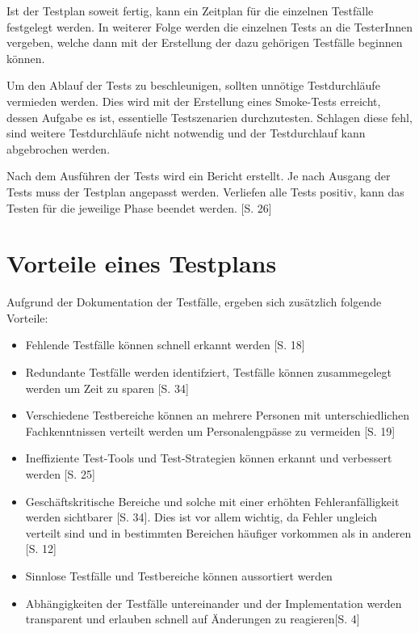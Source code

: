 \documentclass[a4paper,bibtotoc,oneside]{scrbook}
\begin{document}
Ist der Testplan soweit fertig, kann ein Zeitplan für die einzelnen Testfälle festgelegt werden. In weiterer Folge werden die einzelnen Tests an die TesterInnen vergeben, welche dann mit der Erstellung der dazu gehörigen Testfälle beginnen können.

Um den Ablauf der Tests zu beschleunigen, sollten unnötige Testdurchläufe vermieden werden. Dies wird mit der Erstellung eines Smoke-Tests erreicht, dessen Aufgabe es ist, essentielle Testszenarien durchzutesten. Schlagen diese fehl, sind weitere Testdurchläufe nicht notwendig und der Testdurchlauf kann abgebrochen werden. 

Nach dem Ausführen der Tests wird ein Bericht erstellt. Je nach Ausgang der Tests muss der Testplan angepasst werden. Verliefen alle Tests positiv, kann das Testen für die jeweilige Phase beendet werden. \cite{eval_regression}[S. 26]


\section{Vorteile eines Testplans}

Aufgrund der Dokumentation der Testfälle, ergeben sich zusätzlich folgende Vorteile:

\begin{itemize}
	\item Fehlende Testfälle können schnell erkannt werden \cite{test_large_systems}[S. 18]
	\item Redundante Testfälle werden identifziert, Testfälle können zusammegelegt werden um Zeit zu sparen \cite{testing_apps_on_web}[S. 34]
	\item Verschiedene Testbereiche können an mehrere Personen mit unterschiedlichen Fachkenntnissen verteilt werden um Personalengpässe zu vermeiden \cite{test_large_systems}[S. 19]
	\item Ineffiziente Test-Tools und Test-Strategien können erkannt und verbessert werden \cite{eval_regression}[S. 25]
	\item Geschäftskritische Bereiche und solche mit einer erhöhten  Fehleranfälligkeit werden sichtbarer \cite{testing_apps_on_web}[S. 34]. Dies ist vor allem wichtig, da Fehler ungleich verteilt sind und in bestimmten Bereichen häufiger vorkommen als in anderen \cite{eval_regression}[S. 12]
	\item Sinnlose Testfälle und Testbereiche können aussortiert werden 
	\item Abhängigkeiten der Testfälle untereinander und der Implementation werden transparent und erlauben schnell auf Änderungen zu reagieren\cite{test_auto}[S. 4]
\end{itemize}
\end{document}
